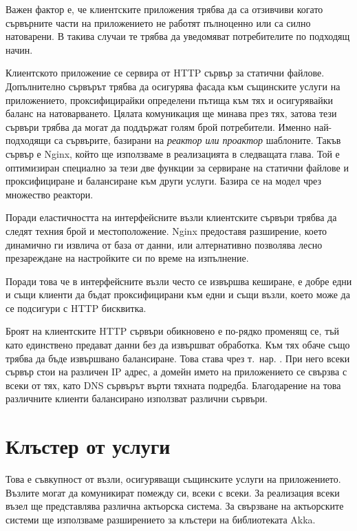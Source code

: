 Важен фактор е, че клиентските приложения трябва да са отзивчиви когато сървърните части на приложението не работят пълноценно или са силно натоварени. В такива случаи те трябва да уведомяват потребителите по подходящ начин.

Клиентското приложение се сервира от HTTP сървър за статични файлове. Допълнително сървърът трябва да осигурява фасада към същинските услуги на приложението, проксифицирайки определени пътища към тях и осигурявайки баланс на натоварването. Цялата комуникация ще минава през тях, затова тези сървъри трябва да могат да поддържат голям брой потребители. Именно най-подходящи са сървърите, базирани на \emph{реактор или проактор} шаблоните. Такъв сървър е Nginx, който ще използваме в реализацията в следващата глава. Той е оптимизиран специално за тези две функции за сервиране на статични файлове и проксифициране и балансиране към други услуги. Базира се на модел чрез множество реактори.

Поради еластичността на интерфейсните възли клиентските сървъри трябва да следят техния брой и местоположение. Nginx предоставя разширение, което динамично ги извлича от база от данни, или алтернативно позволява лесно презареждане на настройките си по време на изпълнение.

Поради това че в интерфейсните възли често се извършва кеширане, е добре едни и същи клиенти да бъдат проксифицирани към едни и същи възли, което може да се подсигури с HTTP бисквитка.

Броят на клиентските HTTP сървъри обикновено е по-рядко променящ се, тъй като единствено предават данни без да извършват обработка. Към тях обаче също трябва да бъде извършвано балансиране. Това става чрез т.~нар.  \cite{rfc1794}. При него всеки сървър стои на различен IP адрес, а домейн името на приложението се свързва с всеки от тях, като DNS сървърът върти тяхната подредба. Благодарение на това различните клиенти балансирано използват различни сървъри.

\section{Клъстер от услуги}

Това е съвкупност от възли, осигуряващи същинските услуги на приложението. Възлите могат да комуникират помежду си, всеки с всеки. За реализация всеки възел ще представлява различна актьорска система. За свързване на актьорските системи ще използваме разширението за клъстери на библиотеката Akka.

